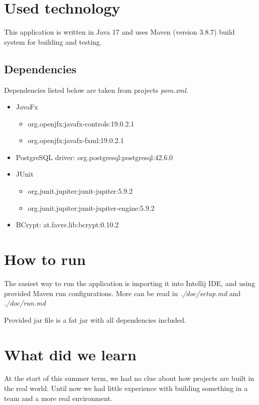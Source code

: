 \documentclass[11pt,twoside,a4paper]{article}
\begin{document}
\section{Used technology}

This application is written in Java 17 and uses Maven (version 3.8.7) build
system for building and testing.

\subsection*{Dependencies}

Dependencies listed below are taken from projects \emph{pom.xml}.

\begin{itemize}
    \item JavaFx
          \begin{itemize}
              \item org.openjfx:javafx-controls:19.0.2.1
              \item org.openjfx:javafx-fxml:19.0.2.1
          \end{itemize}
    \item PostgreSQL driver: org.postgresql:postgresql:42.6.0
    \item JUnit
          \begin{itemize}
              \item org.junit.jupiter:junit-jupiter:5.9.2
              \item org.junit.jupiter:junit-jupiter-engine:5.9.2
          \end{itemize}
    \item BCrypt: at.favre.lib:bcrypt:0.10.2
\end{itemize}

\section{How to run}

The easiest way to run the application is importing it into Intellij IDE, and
using provided Maven run configurations. More can be read in \emph{./doc/setup.md}
and \emph{./doc/run.md}

Provided jar file is a fat jar with all dependencies included.

\section{What did we learn}

At the start of this summer term, we had no clue about how projects are built
in the real world. Until now we had little experience with building something
in a team and a more real environment.
\end{document}
